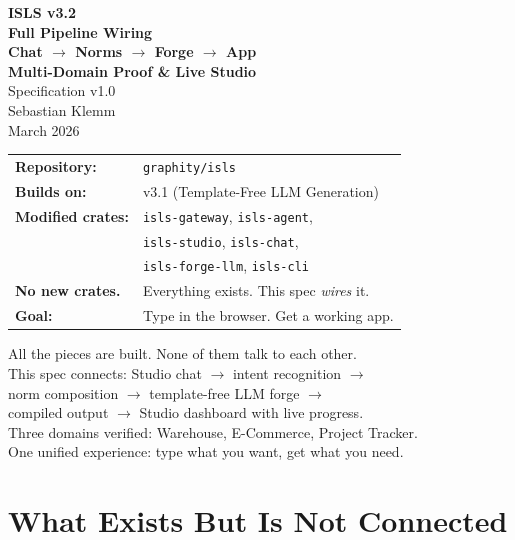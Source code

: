 \documentclass[11pt,a4paper]{article}
\begin{document}
\begin{titlepage}
\begin{center}
\vspace*{1.5cm}
{\Huge\bfseries ISLS v3.2}\\[0.4cm]
{\LARGE\bfseries Full Pipeline Wiring}\\[0.3cm]
{\LARGE\bfseries Chat $\to$ Norms $\to$ Forge $\to$ App}\\[0.3cm]
{\LARGE\bfseries Multi-Domain Proof \& Live Studio}\\[1.2cm]
{\Large Specification v1.0}\\[1.5cm]
{\large Sebastian Klemm}\\[0.3cm]
{\small March 2026}\\[2cm]

\begin{tabular}{ll}
\textbf{Repository:} & \texttt{graphity/isls} \\
\textbf{Builds on:} & v3.1 (Template-Free LLM Generation) \\
\textbf{Modified crates:} & \texttt{isls-gateway}, \texttt{isls-agent}, \\
 & \texttt{isls-studio}, \texttt{isls-chat}, \\
 & \texttt{isls-forge-llm}, \texttt{isls-cli} \\
\textbf{No new crates.} & Everything exists. This spec \emph{wires} it. \\
\textbf{Goal:} & Type in the browser. Get a working app. \\
\end{tabular}

\vfill
{\small
All the pieces are built. None of them talk to each other.\\
This spec connects: Studio chat $\to$ intent recognition $\to$\\
norm composition $\to$ template-free LLM forge $\to$\\
compiled output $\to$ Studio dashboard with live progress.\\[0.3cm]
Three domains verified: Warehouse, E-Commerce, Project Tracker.\\
One unified experience: type what you want, get what you need.
}
\end{center}
\end{titlepage}

\tableofcontents
\newpage

\section{What Exists But Is Not Connected}
\end{document}
